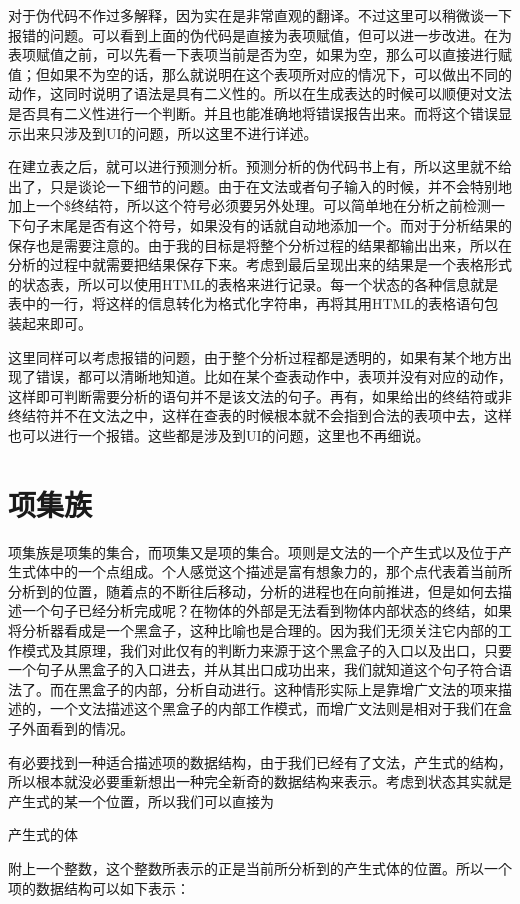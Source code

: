对于伪代码不作过多解释，因为实在是非常直观的翻译。不过这里可以稍微谈一下报错的问题。可以看到上面的伪代码是直接为表项赋值，但可以进一步改进。在为表项赋值之前，可以先看一下表项当前是否为空，如果为空，那么可以直接进行赋值；但如果不为空的话，那么就说明在这个表项所对应的情况下，可以做出不同的动作，这同时说明了语法是具有二义性的。所以在生成表达的时候可以顺便对文法是否具有二义性进行一个判断。并且也能准确地将错误报告出来。而将这个错误显示出来只涉及到UI的问题，所以这里不进行详述。

在建立表之后，就可以进行预测分析。预测分析的伪代码书上有，所以这里就不给出了，只是谈论一下细节的问题。由于在文法或者句子输入的时候，并不会特别地加上一个\$终结符，所以这个符号必须要另外处理。可以简单地在分析之前检测一下句子末尾是否有这个符号，如果没有的话就自动地添加一个。而对于分析结果的保存也是需要注意的。由于我的目标是将整个分析过程的结果都输出出来，所以在分析的过程中就需要把结果保存下来。考虑到最后呈现出来的结果是一个表格形式的状态表，所以可以使用HTML的表格来进行记录。每一个状态的各种信息就是表中的一行，将这样的信息转化为格式化字符串，再将其用HTML的表格语句包装起来即可。

这里同样可以考虑报错的问题，由于整个分析过程都是透明的，如果有某个地方出现了错误，都可以清晰地知道。比如在某个查表动作中，表项并没有对应的动作，这样即可判断需要分析的语句并不是该文法的句子。再有，如果给出的终结符或非终结符并不在文法之中，这样在查表的时候根本就不会指到合法的表项中去，这样也可以进行一个报错。这些都是涉及到UI的问题，这里也不再细说。

\section{项集族}

项集族是项集的集合，而项集又是项的集合。项则是文法的一个产生式以及位于产生式体中的一个点组成。个人感觉这个描述是富有想象力的，那个点代表着当前所分析到的位置，随着点的不断往后移动，分析的进程也在向前推进，但是如何去描述一个句子已经分析完成呢？在物体的外部是无法看到物体内部状态的终结，如果将分析器看成是一个黑盒子，这种比喻也是合理的。因为我们无须关注它内部的工作模式及其原理，我们对此仅有的判断力来源于这个黑盒子的入口以及出口，只要一个句子从黑盒子的入口进去，并从其出口成功出来，我们就知道这个句子符合语法了。而在黑盒子的内部，分析自动进行。这种情形实际上是靠增广文法的项来描述的，一个文法描述这个黑盒子的内部工作模式，而增广文法则是相对于我们在盒子外面看到的情况。

有必要找到一种适合描述项的数据结构，由于我们已经有了文法，产生式的结构，所以根本就没必要重新想出一种完全新奇的数据结构来表示。考虑到状态其实就是产生式的某一个位置，所以我们可以直接为\begin{bfseries}产生式的体\end{bfseries}附上一个整数，这个整数所表示的正是当前所分析到的产生式体的位置。所以一个项的数据结构可以如下表示：

